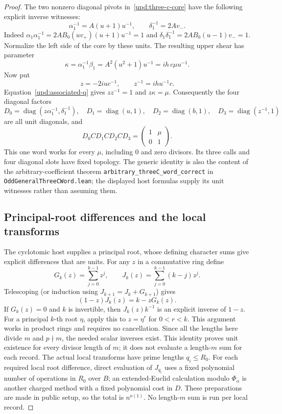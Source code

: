 \begin{proof}
The two nonzero diagonal pivots in~\eqref{upd:three-c-core} have the
following explicit inverse witnesses:
\[
  \alpha_1^{-1}=A(u+1)u^{-1},\qquad
  \delta_1^{-1}=2A v_-.
\]
Indeed $\alpha_1\alpha_1^{-1}=2AB_0(uv_+)(u+1)u^{-1}=1$ and
$\delta_1\delta_1^{-1}=2AB_0(u-1)v_-=1$.  Normalize the left side of
the core by these units.  The resulting upper shear has parameter
\[
  \kappa=\alpha_1^{-1}\beta_1
       =A^2(u^2+1)u^{-1}
       =ih\,c\mu u^{-1}.
\]
Now put
\[
  z=-2iu c^{-1},\qquad z^{-1}=ih u^{-1}c.
\]
Equation~\eqref{upd:associated-q} gives $zz^{-1}=1$ and $z\kappa=\mu$.
Consequently the four diagonal factors
\[
  D_0=\operatorname{diag}(z\alpha_1^{-1},\delta_1^{-1}),\quad
  D_1=\operatorname{diag}(u,1),\quad
  D_2=\operatorname{diag}(b,1),\quad
  D_3=\operatorname{diag}(z^{-1},1)
\]
are all unit diagonals, and
\begin{equation}
\label{upd:three-c-word}
  D_0 C D_1 C D_2 C D_3
       =\begin{pmatrix}1&\mu\\0&1\end{pmatrix}.
\end{equation}
This one word works for every $\mu$, including $0$ and zero divisors.  Its
three calls and four diagonal slots have fixed topology.  The generic
identity is also the content of the arbitrary-coefficient theorem
\texttt{arbitrary\_threeC\_word\_correct} in
\texttt{OddGeneralThreeCWord.lean}; the displayed host formulas supply its
unit witnesses rather than assuming them.

\subsection{Principal-root differences and the local transforms}
\label{upd:roots}

The cyclotomic host supplies a principal root, whose defining character
sums give explicit differences that are units.  For any $z$ in a
commutative ring define
\[
  G_k(z)=\sum_{j=0}^{k-1}z^j,
  \qquad J_k(z)=\sum_{j=0}^{k-1}(k-j)z^j.
\]
Telescoping (or induction using
$J_{k+1}=J_k+G_{k+1}$) gives
\begin{equation}
\label{upd:weighted-geometric}
  (1-z)J_k(z)=k-zG_k(z).
\end{equation}
If $G_k(z)=0$ and $k$ is invertible, then $J_k(z)k^{-1}$ is an explicit
inverse of $1-z$.  For a principal $k$-th root $\eta$, apply this to
$z=\eta^r$ for $0<r<k$.  This argument works in product rings and
requires no cancellation.  Since all the lengths here divide $m$ and
$p\nmid m$, the needed scalar inverses exist.  This identity proves unit
existence for every divisor length of $m$; it does not evaluate a
length-$m$ sum for each record.  The actual local transforms have prime
lengths $q_i\leq R_0$.  For each required local root difference, direct
evaluation of $J_{q_i}$ uses a fixed polynomial number of operations in
$R_0$ over $B$; an extended-Euclid calculation modulo $\Phi_\alpha$ is
another charged method with a fixed polynomial cost in $D$.  These
preparations are made in public setup, so
the total is $n^{o(1)}$.  No length-$m$ sum is run per local record.


\end{proof}
